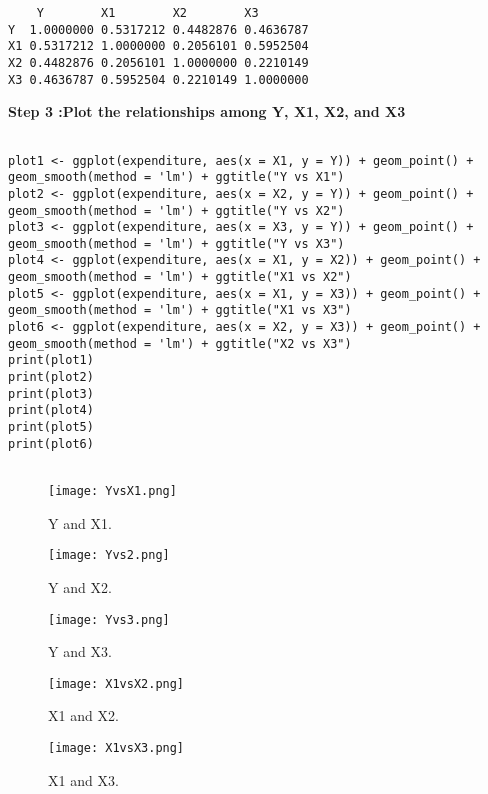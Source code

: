 \documentclass[12pt]{article}
\begin{document}
\begin{verbatim}
    Y        X1        X2        X3
Y  1.0000000 0.5317212 0.4482876 0.4636787
X1 0.5317212 1.0000000 0.2056101 0.5952504
X2 0.4482876 0.2056101 1.0000000 0.2210149
X3 0.4636787 0.5952504 0.2210149 1.0000000
\end{verbatim}

\textbf{Step 3 :Plot the relationships among Y, X1, X2, and X3}
\begin{lstlisting}[style =my]

plot1 <- ggplot(expenditure, aes(x = X1, y = Y)) + geom_point() + geom_smooth(method = 'lm') + ggtitle("Y vs X1")
plot2 <- ggplot(expenditure, aes(x = X2, y = Y)) + geom_point() + geom_smooth(method = 'lm') + ggtitle("Y vs X2")
plot3 <- ggplot(expenditure, aes(x = X3, y = Y)) + geom_point() + geom_smooth(method = 'lm') + ggtitle("Y vs X3")
plot4 <- ggplot(expenditure, aes(x = X1, y = X2)) + geom_point() + geom_smooth(method = 'lm') + ggtitle("X1 vs X2")
plot5 <- ggplot(expenditure, aes(x = X1, y = X3)) + geom_point() + geom_smooth(method = 'lm') + ggtitle("X1 vs X3")
plot6 <- ggplot(expenditure, aes(x = X2, y = X3)) + geom_point() + geom_smooth(method = 'lm') + ggtitle("X2 vs X3")
print(plot1)
print(plot2)
print(plot3)
print(plot4)
print(plot5)
print(plot6)


\end{lstlisting}

\begin{figure}[h!]\centering
	\caption{\footnotesize  Y and X1.}
	\label{fig:plot_1}
	\texttt{[image: YvsX1.png]}
\end{figure}
\begin{figure}[h!]\centering
	\caption{\footnotesize  Y and X2.}
	\label{fig:plot_1}
	\texttt{[image: Yvs2.png]}
\end{figure}

\begin{figure}[h!]\centering
	\caption{\footnotesize  Y and X3.}
	\label{fig:plot_1}
	\texttt{[image: Yvs3.png]}
\end{figure}


\begin{figure}[h!]\centering
	\caption{\footnotesize  X1 and X2.}
	\label{fig:plot_1}
	\texttt{[image: X1vsX2.png]}
\end{figure}


\begin{figure}[h!]\centering
	\caption{\footnotesize  X1 and X3.}
	\label{fig:plot_1}
	\texttt{[image: X1vsX3.png]}
\end{figure}
\end{document}
